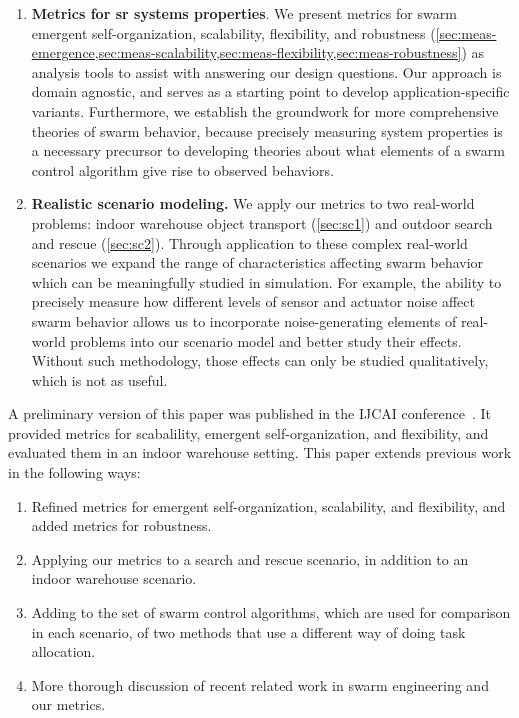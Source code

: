 \begin{enumerate}
\item \textbf{Metrics for \gls{sr} systems properties}.  We present metrics for swarm
  emergent self-organization, scalability, flexibility, and robustness
  (\cref{sec:meas-emergence,sec:meas-scalability,sec:meas-flexibility,sec:meas-robustness})
  as analysis tools to assist with answering our design questions. Our approach
  is domain agnostic, and serves as a starting point to develop
  application-specific variants. Furthermore, we establish the groundwork for
  more comprehensive theories of swarm behavior, because precisely measuring
  system properties is a necessary precursor to developing theories about what
  elements of a swarm control algorithm give rise to observed behaviors.
\item \textbf{Realistic scenario modeling.}  We apply our metrics to two
  real-world problems: indoor warehouse object transport (\cref{sec:sc1}) and
  outdoor search and rescue (\cref{sec:sc2}).  Through application to these
  complex real-world scenarios we expand the range of characteristics affecting
  swarm behavior which can be meaningfully studied in simulation. For example,
  the ability to precisely measure how different levels of sensor and actuator
  noise affect swarm behavior allows us to incorporate noise-generating elements
  of real-world problems into our scenario model and better study their
  effects. Without such methodology, those effects can only be studied
  qualitatively, which is not as useful.
\end{enumerate}
%
%
A preliminary version of this paper was published in the IJCAI
conference~\cite{Harwell2019a}. It provided metrics for scabalility,
emergent self-organization, and flexibility, and evaluated them in an indoor
warehouse setting. This paper extends previous work in the following ways:
%
\begin{enumerate}
\item {Refined metrics for emergent self-organization, scalability,  and
    flexibility, and added metrics for robustness.}
\item {Applying our metrics to a search and rescue scenario, in addition to an
    indoor warehouse scenario.}
\item {Adding to the set of swarm control algorithms, which are used for
    comparison in each scenario, of two methods that use a different way of
    doing task allocation.}
\item {More thorough discussion of recent related work in swarm engineering and
    our metrics.  }
\end{enumerate}
